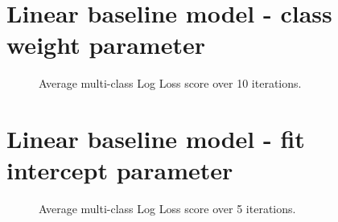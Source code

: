 
\section*{Linear baseline model - class weight parameter}

\begin{figure}[H]
    \captionsetup{width=0.85\linewidth}
    \captionsetup{justification=centering}
    \caption{Average multi-class Log Loss score over 10 iterations.}
    \label{fig:2-LBM-model_weight_class}
\end{figure}


\section*{Linear baseline model - fit intercept parameter}

\begin{figure}[H]
    \captionsetup{width=0.85\linewidth}
    \captionsetup{justification=centering}
    \caption{Average multi-class Log Loss score over 5 iterations.}
    \label{fig:2-LBM-model_fit_intercept}
\end{figure}